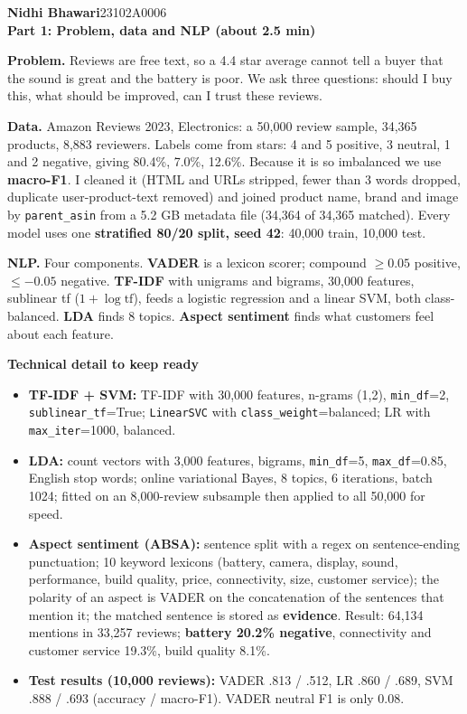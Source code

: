 \documentclass[10pt,a4paper]{article}
\newcommand{\lab}[1]{{\color{accent}\bfseries #1}}
\newcommand{\speaker}[3]{%
  \begin{tcolorbox}[colback=navy,colframe=navy,arc=3pt,left=8pt,right=8pt,top=4pt,bottom=4pt]
  {\color{white}\bfseries\Large #1}\hfill{\color{white!70!navy}\small #2}\\[1pt]{\color{accent!60!white}\bfseries #3}
  \end{tcolorbox}\vspace{-2pt}}
\begin{document}
\speaker{Nidhi Bhawari}{23102A0006}{Part 1: Problem, data and NLP \quad (about 2.5 min)}
\begin{say}
\lab{Problem.} Reviews are free text, so a 4.4 star average cannot tell a buyer that the sound is great and the battery is poor. We ask three questions: should I buy this, what should be improved, can I trust these reviews.\par
\lab{Data.} Amazon Reviews 2023, Electronics: a 50,000 review sample, 34,365 products, 8,883 reviewers. Labels come from stars: 4 and 5 positive, 3 neutral, 1 and 2 negative, giving 80.4\%, 7.0\%, 12.6\%. Because it is so imbalanced we use \textbf{macro-F1}. I cleaned it (HTML and URLs stripped, fewer than 3 words dropped, duplicate user-product-text removed) and joined product name, brand and image by \texttt{parent\_asin} from a 5.2 GB metadata file (34,364 of 34,365 matched). Every model uses one \textbf{stratified 80/20 split, seed 42}: 40,000 train, 10,000 test.\par
\lab{NLP.} Four components. \textbf{VADER} is a lexicon scorer; compound $\ge0.05$ positive, $\le-0.05$ negative. \textbf{TF-IDF} with unigrams and bigrams, 30,000 features, sublinear tf ($1+\log \mathrm{tf}$), feeds a logistic regression and a linear SVM, both class-balanced. \textbf{LDA} finds 8 topics. \textbf{Aspect sentiment} finds what customers feel about each feature.
\end{say}
\par\vspace{2pt}\textbf{Technical detail to keep ready}\par
\begin{itemize}
\item \textbf{TF-IDF + SVM:} TF-IDF with 30,000 features, n-grams (1,2), \texttt{min\_df}=2, \texttt{sublinear\_tf}=True; \texttt{LinearSVC} with \texttt{class\_weight}=balanced; LR with \texttt{max\_iter}=1000, balanced.
\item \textbf{LDA:} count vectors with 3,000 features, bigrams, \texttt{min\_df}=5, \texttt{max\_df}=0.85, English stop words; online variational Bayes, 8 topics, 6 iterations, batch 1024; fitted on an 8,000-review subsample then applied to all 50,000 for speed.
\item \textbf{Aspect sentiment (ABSA):} sentence split with a regex on sentence-ending punctuation; 10 keyword lexicons (battery, camera, display, sound, performance, build quality, price, connectivity, size, customer service); the polarity of an aspect is VADER on the concatenation of the sentences that mention it; the matched sentence is stored as \textbf{evidence}. Result: 64,134 mentions in 33,257 reviews; \textbf{battery 20.2\% negative}, connectivity and customer service 19.3\%, build quality 8.1\%.
\item \textbf{Test results (10,000 reviews):} VADER .813 / .512, LR .860 / .689, SVM .888 / .693 (accuracy / macro-F1). VADER neutral F1 is only 0.08.
\end{itemize}
\end{document}
